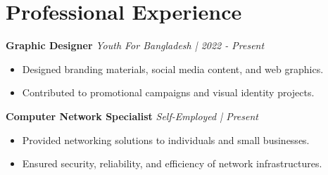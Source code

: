 \section*{Professional Experience}
\textbf{Graphic Designer} \hfill \textit{Youth For Bangladesh | 2022 - Present} \\
\begin{itemize}[leftmargin=1cm, label={\color{primary}\textbullet}]
    \item Designed branding materials, social media content, and web graphics.
    \item Contributed to promotional campaigns and visual identity projects.
\end{itemize}
\vspace{5mm}
\textbf{Computer Network Specialist} \hfill \textit{Self-Employed | Present} \\
\begin{itemize}[leftmargin=1cm, label={\color{primary}\textbullet}]
    \item Provided networking solutions to individuals and small businesses.
    \item Ensured security, reliability, and efficiency of network infrastructures.
\end{itemize}